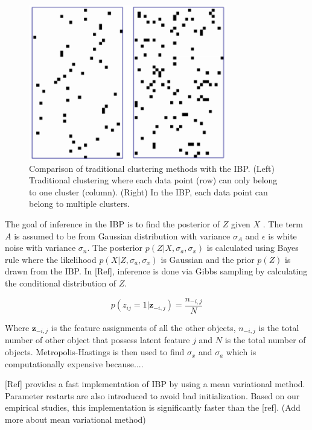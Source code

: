 \documentclass{article}
\begin{document}
\begin{figure}[ht]
\vskip 0.2in
\begin{center}
\centerline{\includegraphics[width=\columnwidth]{IBPcomp}}
\caption{Comparison of traditional clustering methods with the IBP. (Left) Traditional clustering where each data point (row) can only belong to one cluster (column). (Right) In the IBP, each data point can belong to multiple clusters.}
\label{IBPcomp}
\end{center}
\vskip -0.2in
\end{figure} 

The goal of inference in the IBP is to find the posterior of $Z$ given $X$ . The term $A$ is assumed to be from Gaussian distribution with variance $\sigma_{A}$ and $\epsilon$ is white noise with variance $\sigma_n$. The posterior $p(Z|X,\sigma_a,\sigma_x)$ is calculated using Bayes rule where the likelihood $p(X|Z,\sigma_a,\sigma_x)$ is Gaussian and the prior $p(Z)$ is drawn from the IBP. In [Ref], inference is done via Gibbs sampling by calculating the conditional distribution of $Z$.

$$
p(z_{ij}=1|\textbf{z}_{-i,j})=\frac{n_{-i,j}}{N}
$$

Where $\textbf{z}_{-i,j}$ is the feature assignments of all the other objects, $n_{-i,j}$ is the total number of other object that possess latent feature $j$ and $N$ is the total number of objects. Metropolis-Hastings is then used to find $\sigma_x$ and $\sigma_a$ which is computationally expensive because....

[Ref] provides a fast implementation of IBP by using a mean variational method. Parameter restarts are also introduced to avoid bad initialization. Based on our empirical studies, this implementation is significantly faster than the [ref]. (Add more about mean variational method)
\end{document}
